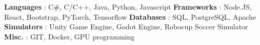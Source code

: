 \begin{cventries}  
\skillentry
    {
    \newline \bullet \space \textbf{Languages} : C\#, C/C++, Java, Python, Javascript 
    \newline \bullet \space \textbf{Frameworks} : Node.JS, React, Bootstrap, PyTorch, Tensorflow
    \newline \bullet \space \textbf{Databases} : SQL, PostgreSQL, Apache
    \newline \bullet \space \textbf{Simulators} : Unity Game Engine, Godot Engine, Robocup Soccer Simulator
    \newline \bullet \space \textbf{Misc.} : GIT, Docker, GPU programming
    }
    

\end{cventries}
\vspace{0.5 cm}